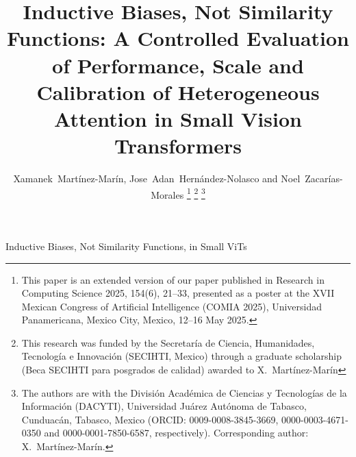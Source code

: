 \documentclass[journal]{IEEEtran}
\begin{document}
\title{Inductive Biases, Not Similarity Functions: A Controlled Evaluation of Performance, Scale and Calibration of Heterogeneous Attention in Small Vision Transformers}

\author{Xamanek~Martínez-Marín, Jose~Adan~Hernández-Nolasco and Noel~Zacarías-Morales%
\thanks{This paper is an extended version of our paper published in Research in Computing Science 2025, 154(6), 21--33, presented as a poster at the XVII Mexican Congress of Artificial Intelligence (COMIA 2025), Universidad Panamericana, Mexico City, Mexico, 12--16 May 2025.}%
\thanks{This research was funded by the Secretaría de Ciencia, Humanidades, Tecnología e Innovación (SECIHTI, Mexico) through a graduate scholarship (Beca SECIHTI para posgrados de calidad) awarded to X.~Martínez-Marín}%
\thanks{The authors are with the División Académica de Ciencias y Tecnologías de la Información (DACYTI), Universidad Juárez Autónoma de Tabasco, Cunduacán, Tabasco, Mexico (ORCID: 0009-0008-3845-3669, 0000-0003-4671-0350 and 0000-0001-7850-6587, respectively). Corresponding author: X.~Martínez-Marín.}}

%
{Inductive Biases, Not Similarity Functions, in Small ViTs}

\maketitle
\end{document}
